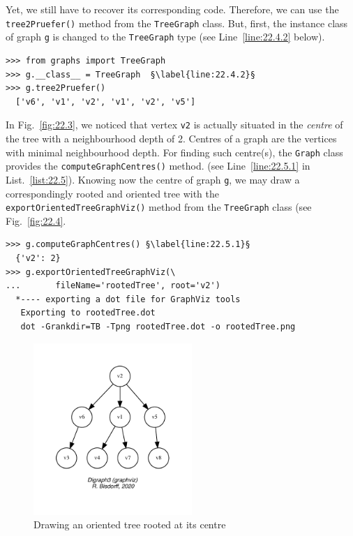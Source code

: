 Yet, we still have to recover its corresponding \Pruefer code. Therefore, we can use the \texttt{tree2Pruefer()} method  from the \texttt{TreeGraph} class. But, first, the instance class of graph \texttt{g} is changed to the \texttt{TreeGraph} type (see Line~\ref{line:22.4.2} below). 
\begin{lstlisting}[caption={Computing the \Pruefer code of a tree graph instance.},label=list:22.4]
>>> from graphs import TreeGraph
>>> g.__class__ = TreeGraph  §\label{line:22.4.2}§
>>> g.tree2Pruefer()
  ['v6', 'v1', 'v2', 'v1', 'v2', 'v5']
\end{lstlisting}

In Fig.~\vref{fig:22.3}, we noticed that vertex \texttt{v2} is actually situated in the \emph{centre} of the tree with a neighbourhood depth of 2. Centres of a graph are the vertices with minimal neighbourhood depth. For finding such centre(s), the \texttt{Graph} class provides the \texttt{computeGraphCentres()} method. (see Line~\ref{line:22.5.1} in List.~\vref{list:22.5}). Knowing now the centre of graph \texttt{g}, we may draw a correspondingly rooted and oriented tree with the \texttt{exportOrientedTreeGraphViz()} method from the \texttt{TreeGraph} class (see Fig.~\vref{fig:22.4}.  
\begin{lstlisting}[caption={Computing the centres of a tree and drawing a rooted and oriented tree.},label=list:22.5]
>>> g.computeGraphCentres() §\label{line:22.5.1}§
  {'v2': 2}
>>> g.exportOrientedTreeGraphViz(\
...       fileName='rootedTree', root='v2')
  *---- exporting a dot file for GraphViz tools
   Exporting to rootedTree.dot
   dot -Grankdir=TB -Tpng rootedTree.dot -o rootedTree.png
\end{lstlisting}
\begin{figure}[ht]
\sidecaption[t]
\includegraphics[width=6cm]{Figures/22-4-rootedTree.pdf}
\caption{Drawing an oriented tree rooted at its centre} 
\label{fig:22.4}       %
\end{figure}

